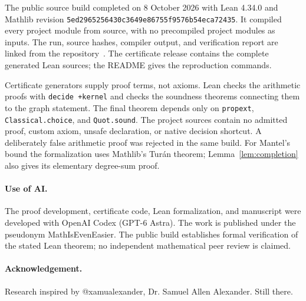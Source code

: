 \documentclass[11pt]{article}
\begin{document}
The public source build completed on 8 October 2026 with Lean 4.34.0
and Mathlib revision \texttt{5ed2965256430c3649e86755f9576b54eca72435}.
It compiled every project module from source, with no precompiled
project modules as inputs. The run, source hashes, compiler output,
and verification report are linked from the repository~\cite{artifact}.
The certificate release contains the complete generated Lean sources;
the README gives the reproduction commands.

Certificate generators supply proof terms, not axioms. Lean checks
the arithmetic proofs with \texttt{decide +kernel} and checks the
soundness theorems connecting them to the graph statement. The final
theorem depends only on \texttt{propext}, \texttt{Classical.choice}, and
\texttt{Quot.sound}. The project sources contain no admitted proof,
custom axiom, unsafe declaration, or native decision shortcut.
A deliberately false arithmetic proof was rejected in the same build.
For Mantel's bound the formalization uses Mathlib's Tur\'an theorem;
Lemma~\ref{lem:completion} also gives its elementary degree-sum proof.

\paragraph{Use of AI.}
The proof development, certificate code, Lean formalization, and
manuscript were developed with OpenAI Codex (GPT-6 Astra).
The work is published under the pseudonym MathIsEvenEasier.
The public build establishes formal verification of the stated Lean
theorem; no independent mathematical peer review is claimed.

\paragraph{Acknowledgement.}
Research inspired by @xamualexander, Dr. Samuel Allen Alexander. Still there.
\end{document}
